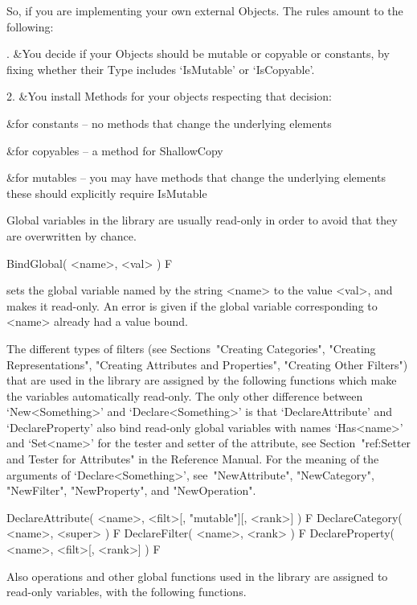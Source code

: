 So, if you are implementing your own external Objects. The rules amount to the
following:

. &You decide if your Objects should be mutable or copyable or constants, by
fixing whether their Type includes `IsMutable' or `IsCopyable'.

2. &You install Methods for your objects respecting that decision:

\beginitems
\* &for constants -- no methods that change the underlying elements

\* &for copyables -- a method for ShallowCopy

\* &for mutables  -- you may have methods that change the underlying elements
		   these should explicitly require IsMutable
\enditems
\enditems


Global variables in the {\GAP} library are usually read-only in order to
avoid that they are overwritten by chance.

\>BindGlobal( <name>, <val> ) F

sets the global variable named by the string <name> to the value <val>,
and makes it read-only.
An error is given if the global variable corresponding to <name>
already had a value bound.

The different types of filters (see Sections~"Creating Categories",
"Creating Representations", "Creating Attributes and Properties",
"Creating Other Filters") that are used in the {\GAP} library are
assigned by the following functions which make the variables automatically
read-only.
The only other difference between `New<Something>' and
`Declare<Something>' is that `DeclareAttribute' and `DeclareProperty'
also bind read-only global variables with names `Has<name>' and `Set<name>'
for the tester and setter of the attribute,
see Section~"ref:Setter and Tester for Attributes" in the Reference Manual.
For the meaning of the arguments of `Declare<Something>',
see~"NewAttribute", "NewCategory", "NewFilter", "NewProperty",
and "NewOperation".

\>DeclareAttribute( <name>, <filt>[, "mutable"][, <rank>] ) F
\>DeclareCategory( <name>, <super> ) F
\>DeclareFilter( <name>, <rank> ) F
\>DeclareProperty( <name>, <filt>[, <rank>] ) F

Also operations and other global functions used in the {\GAP} library
are assigned to read-only variables, with the following functions.

